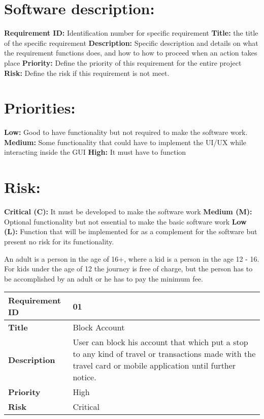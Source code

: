 \section*{Software description:}
\textbf{Requirement ID:} Identification number for specific requirement
\textbf{Title:} the title of the specific requirement
\textbf{Description:} Specific description and details on what the requirement functions does, and how to how to proceed when an action takes place
\textbf{Priority:} Define the priority of this requirement for the entire project
\textbf{Risk:} Define the risk if this requirement is not meet.

\section*{Priorities:}
\textbf{Low:} Good to have functionality but not required to make the software work.
\textbf{Medium:} Some functionality that could have to implement the UI/UX while interacting inside the GUI
\textbf{High:} It must have to function

\section*{Risk:}
\textbf{Critical (C):} It must be developed to make the software work
\textbf{Medium (M):} Optional functionality but not essential to make the basic software work
\textbf{Low (L):} Function that will be implemented for as a complement for the software but present no risk for its functionality. 

An adult is a person in the age of 16+, where a kid is a person in the age 12 - 16. For kids under the age of 12 the journey is free of charge, but the person has to be accomplished by an adult or he has to pay the minimum fee.

\begin{center}
	\def\arraystretch{1.5}%
    \begin{tabular}{ | p{5cm} | p{5cm} |}
    \hline
    	\textbf{Requirement ID} & 01 \\ \hline
		\textbf{Title} & Block Account\\ \hline
		\textbf{Description} & User can block his account that which put a stop to any kind of travel or transactions made with the travel card or mobile application until further notice.\\ \hline
		\textbf{Priority} & High\\ \hline
		\textbf{Risk} & Critical\\
      \hline
    \end{tabular}
\end{center}

